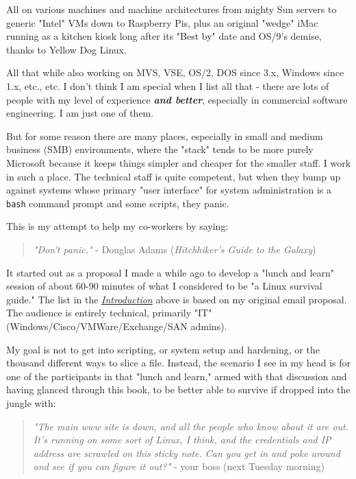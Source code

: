 \documentclass[10pt,american,]{book}
\numberwithin{figure}{chapter}
\DeclareRobustCommand{\drdis}[1]{
    \index{#1 (Linux distro)}
    \index{Linux distros!#1}
}
\begin{document}
All on various machines and machine architectures from mighty Sun
servers to generic "Intel" VMs down to Raspberry Pis, plus an original
"wedge" iMac running as a kitchen kiosk long after its "Best by" date
and OS/9's demise, thanks to Yellow Dog Linux. \drdis{Yellow Dog}

All that while also working on MVS, VSE, OS/2, DOS since 3.x, Windows
since 1.x, etc., etc. I don't think I am special when I list all that -
there are lots of people with my level of experience \textbf{\emph{and
better}}, especially in commercial software engineering. I am just one
of them.

But for some reason there are many places, especially in small and
medium business (SMB) environments, where the "stack" tends to be more
purely Microsoft because it keeps things simpler and cheaper for the
smaller staff. I work in such a place. The technical staff is quite
competent, but when they bump up against systems whose primary "user
interface" for system administration is a \texttt{bash} command prompt
and some scripts, they panic.

This is my attempt to help my co-workers by saying:

\begin{quote}
\emph{"Don't panic."} - Douglas Adams (\emph{Hitchhiker's Guide to the
Galaxy})
\end{quote}

It started out as a proposal I made a while ago to develop a "lunch and
learn" session of about 60-90 minutes of what I considered to be "a
Linux survival guide." The list in the
\protect\hyperlink{introduction}{\emph{Introduction}} above is based on
my original email proposal. The audience is entirely technical,
primarily "IT" (Windows/Cisco/VMWare/Exchange/SAN admins).

My goal is not to get into scripting, or system setup and hardening, or
the thousand different ways to slice a file. Instead, the scenario I see
in my head is for one of the participants in that "lunch and learn,"
armed with that discussion and having glanced through this book, to be
better able to survive if dropped into the jungle with:

\begin{quote}
\emph{"The main www site is down, and all the people who know about it
are out. It's running on some sort of Linux, I think, and the
credentials and IP address are scrawled on this sticky note. Can you get
in and poke around and see if you can figure it out?"} - your boss (next
Tuesday morning)
\end{quote}
\end{document}
